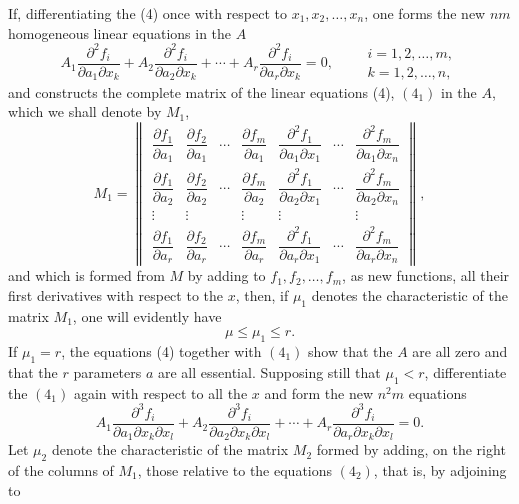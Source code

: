 \documentclass[11pt]{book}
\begin{document}
If, differentiating the (4) once with respect to $x_1,x_2,\ldots,x_n$, one forms the new $nm$ homogeneous linear equations in the $A$
\begin{equation*}\tag{$4_1$}
 A_1\frac{\partial^2 f_i}{\partial a_1\partial x_k}+A_2\frac{\partial^2 f_i}{\partial a_2\partial x_k}+\cdots+A_r\frac{\partial^2 f_i}{\partial a_r\partial x_k}=0,
 \qquad\begin{gathered} i=1,2,\ldots,m,\\ k=1,2,\ldots,n,\end{gathered}
\end{equation*}
and constructs the complete matrix of the linear equations (4), $(4_1)$ in the $A$, which we shall denote by $M_1$,
\[
M_1=\left\|\begin{array}{ccccccc}
\dfrac{\partial f_1}{\partial a_1}&\dfrac{\partial f_2}{\partial a_1}&\cdots&\dfrac{\partial f_m}{\partial a_1}&
\dfrac{\partial^2 f_1}{\partial a_1\partial x_1}&\cdots&\dfrac{\partial^2 f_m}{\partial a_1\partial x_n}\\[0.65em]
\dfrac{\partial f_1}{\partial a_2}&\dfrac{\partial f_2}{\partial a_2}&\cdots&\dfrac{\partial f_m}{\partial a_2}&
\dfrac{\partial^2 f_1}{\partial a_2\partial x_1}&\cdots&\dfrac{\partial^2 f_m}{\partial a_2\partial x_n}\\
\vdots&\vdots&&\vdots&\vdots&&\vdots\\
\dfrac{\partial f_1}{\partial a_r}&\dfrac{\partial f_2}{\partial a_r}&\cdots&\dfrac{\partial f_m}{\partial a_r}&
\dfrac{\partial^2 f_1}{\partial a_r\partial x_1}&\cdots&\dfrac{\partial^2 f_m}{\partial a_r\partial x_n}
\end{array}\right\|,
\]
and which is formed from $M$ by adding to $f_1,f_2,\ldots,f_m$, as new functions, all their first derivatives with respect to the $x$, then, if $\mu_1$ denotes the characteristic of the matrix $M_1$, one will evidently have
\[
 \mu\le \mu_1\le r.
\]
If $\mu_1=r$, the equations (4) together with $(4_1)$ show that the $A$ are all zero and that the $r$ parameters $a$ are all essential. Supposing still that $\mu_1<r$, differentiate the $(4_1)$ again with respect to all the $x$ and form the new $n^2m$ equations
\begin{equation*}\tag{$4_2$}
 A_1\frac{\partial^3 f_i}{\partial a_1\partial x_k\partial x_l}+A_2\frac{\partial^3 f_i}{\partial a_2\partial x_k\partial x_l}+\cdots+A_r\frac{\partial^3 f_i}{\partial a_r\partial x_k\partial x_l}=0.
\end{equation*}
Let $\mu_2$ denote the characteristic of the matrix $M_2$ formed by adding, on the right of the columns of $M_1$, those relative to the equations $(4_2)$, that is, by adjoining to
\end{document}
